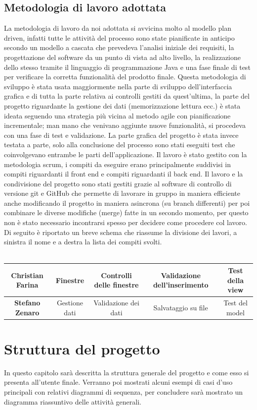 \documentclass[ 4paper,11pt,openany]{book}
\begin{document}
\section{Metodologia di lavoro adottata}
La metodologia di lavoro da noi adottata si avvicina molto al modello plan driven, infatti tutte le attività del processo sono state pianificate in anticipo secondo un modello a cascata che prevedeva l'analisi iniziale dei requisiti, la progettazione del software da un punto di vista ad alto livello, la realizzazione dello stesso tramite il linguaggio di programmazione Java e una fase finale di test per verificare la corretta funzionalità del prodotto finale.
Questa metodologia di sviluppo è stata usata maggiormente nella parte di sviluppo dell'interfaccia grafica e di tutta la parte relativa ai controlli gestiti da quest'ultima, la parte del progetto riguardante la gestione dei dati (memorizzazione lettura ecc.) è stata ideata seguendo una strategia più vicina al metodo agile con pianificazione incrementale; man mano che venivano aggiunte nuove funzionalità, si procedeva con una fase di test e validazione. La parte grafica del progetto è stata invece testata a parte, solo alla conclusione del processo sono stati eseguiti test che coinvolgevano entrambe le parti dell'applicazione. Il lavoro è stato gestito con la metodologia scrum, i compiti da eseguire erano principalmente suddivisi in compiti riguardanti il front end e compiti riguardanti il back end. 
Il lavoro e la condivisione del progetto sono stati gestiti grazie al software di controllo di versione git e GitHub che permette di lavorare in gruppo in maniera efficiente anche modificando il progetto in maniera asincrona (su branch differenti) per poi combinare le diverse modifiche (merge) fatte in un secondo momento, per questo non è stato necessario incontrarsi spesso per decidere come procedere col lavoro.  Di seguito è riportato un breve schema che riassume la divisione dei lavori, a sinistra il nome e a destra la lista dei compiti svolti.\\ \\
\begin{tabular}{|c|c|c|c|c|}
\hline
\textbf{Christian Farina} & Finestre & Controlli delle finestre & Validazione dell'inserimento & Test della view\\
\hline
\textbf{Stefano Zenaro} & Gestione dati & Validazione dei dati & Salvataggio su file & Test del model\\
\hline
\end{tabular}

\chapter{Struttura del progetto}
In questo capitolo sarà descritta la struttura generale del progetto e come esso si presenta all'utente finale. Verranno poi mostrati alcuni esempi di casi d'uso principali con relativi diagrammi di sequenza, per concludere sarà mostrato un diagramma riassuntivo delle attività generali.
\end{document}
